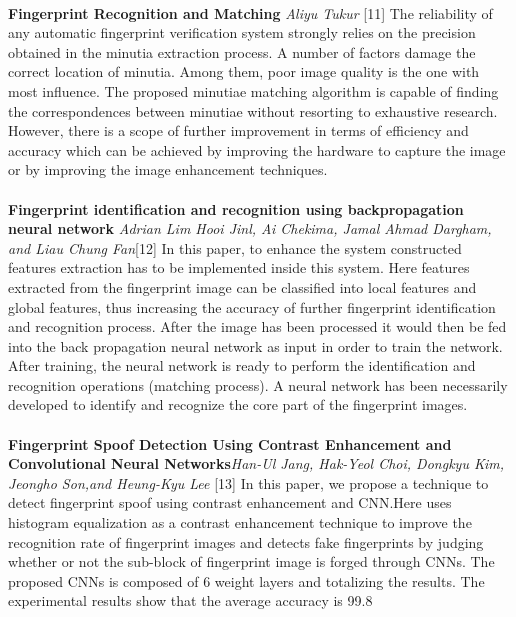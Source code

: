 \documentclass[a4paper,12pt,oneside]{article}
\begin{document}
\paragraph{}
\textbf{Fingerprint Recognition and Matching }\textit{Aliyu Tukur
}[11] The reliability of any automatic fingerprint verification system strongly relies on the precision obtained in the minutia extraction process. A number of factors damage the correct location of minutia. Among them, poor image quality is the one with most influence. The proposed minutiae matching algorithm is  capable of finding the correspondences between minutiae without resorting to exhaustive research. However, there is a scope of further improvement in terms of efficiency and accuracy which can be achieved by improving  the hardware to
capture the image or by improving the image enhancement techniques.






\paragraph{}
\textbf{Fingerprint identification and recognition using backpropagation neural network}\textit{ Adrian Lim Hooi Jinl, Ai Chekima, Jamal Ahmad Dargham, and Liau Chung Fan}[12] In this paper, to enhance the system constructed features
extraction has to be implemented inside this system.
Here features extracted from the
fingerprint image can be classified into local features
and global features, thus increasing the accuracy of
further fingerprint identification and recognition
process. After the image has been processed it
would then be fed into the back propagation neural
network as input in order to train the network. After
training, the neural network is ready to perform the
identification and recognition operations (matching
process). A neural network has been necessarily
developed to identify and recognize the core part of
the fingerprint images.
\paragraph{}
\textbf{Fingerprint Spoof Detection Using Contrast
Enhancement and Convolutional
Neural Networks}\textit{Han-Ul Jang, Hak-Yeol Choi, Dongkyu Kim, Jeongho Son,and Heung-Kyu Lee }[13] In this paper, we propose a technique to detect fingerprint spoof using contrast enhancement and CNN.Here uses histogram equalization as a contrast enhancement technique to improve the recognition rate of fingerprint images and detects fake fingerprints by judging whether or not the sub-block of fingerprint image is forged through CNNs. The proposed CNNs is composed of 6 weight layers and totalizing the results. The experimental results show that the average accuracy is 99.8%
\end{document}
